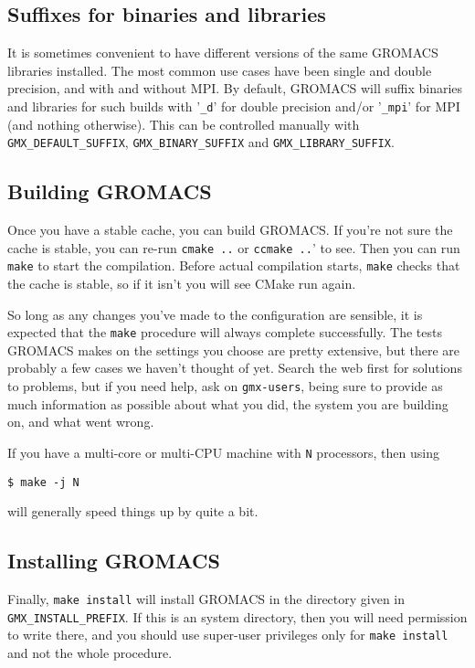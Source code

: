 \documentclass{article}[12pt,a4paper,twoside]
\newcommand{\gromacs}{GROMACS}
\newcommand{\mpi}{MPI}
\newcommand{\cmake}{CMake}
\begin{document}
\subsection{Suffixes for binaries and libraries}
It is sometimes convenient to have different versions of the same
\gromacs{} libraries installed. The most common use cases have been
single and double precision, and with and without \mpi{}. By default,
\gromacs{} will suffix binaries and libraries for such builds with
'\verb+_d+' for double precision and/or '\verb+_mpi+' for \mpi{} (and
nothing otherwise). This can be controlled manually with
\texttt{GMX\_DEFAULT\_SUFFIX}, \texttt{GMX\_BINARY\_SUFFIX} and
\texttt{GMX\_LIBRARY\_SUFFIX}.

\subsection{Building \gromacs{}}

Once you have a stable cache, you can build \gromacs{}. If you're not
sure the cache is stable, you can re-run \verb+cmake ..+ or
\verb+ccmake ..+' to see. Then you can run \texttt{make} to start the
compilation. Before actual compilation starts, \texttt{make} checks
that the cache is stable, so if it isn't you will see \cmake{} run
again.

So long as any changes you've made to the configuration are sensible,
it is expected that the \texttt{make} procedure will always complete
successfully. The tests \gromacs{} makes on the settings you choose
are pretty extensive, but there are probably a few cases we haven't
thought of yet. Search the web first for solutions to problems,
but if you need help, ask on \texttt{gmx-users}, being sure to provide
as much information as possible about what you did, the system you are
building on, and what went wrong.

If you have a multi-core or multi-CPU machine with \texttt{N}
processors, then using
\begin{verbatim}
$ make -j N
\end{verbatim}
will generally speed things up by quite a bit.

\subsection{Installing \gromacs{}}

Finally, \texttt{make install} will install \gromacs{} in the
directory given in \texttt{GMX\_INSTALL\_PREFIX}. If this is an system
directory, then you will need permission to write there, and you
should use super-user privileges only for \texttt{make install} and
not the whole procedure.
\end{document}
